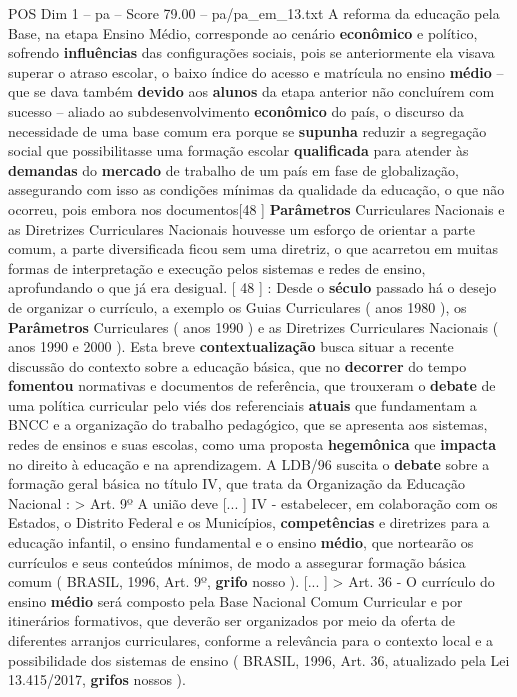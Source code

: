 \begin{textsample}{POS Dim 1 – pa – Score 79.00 – pa/pa\_em\_13.txt}
A reforma da educação pela Base, na etapa Ensino Médio, corresponde ao cenário \textbf{econômico} e político, sofrendo \textbf{influências} das configurações sociais, pois se anteriormente ela visava superar o atraso escolar, o baixo índice do acesso e matrícula no ensino \textbf{médio} – que se dava também \textbf{devido} aos \textbf{alunos} da etapa anterior não concluírem com sucesso – aliado ao subdesenvolvimento \textbf{econômico} do país, o discurso da necessidade de uma base comum era porque se \textbf{supunha} reduzir a segregação social que possibilitasse uma formação escolar \textbf{qualificada} para atender às \textbf{demandas} do \textbf{mercado} de trabalho de um país em fase de globalização, assegurando com isso as condições mínimas da qualidade da educação, o que não ocorreu, pois embora nos documentos[48 ] \textbf{Parâmetros} Curriculares Nacionais e as Diretrizes Curriculares Nacionais houvesse um esforço de orientar a parte comum, a parte diversificada ficou sem uma diretriz, o que acarretou em muitas formas de interpretação e execução pelos sistemas e redes de ensino, aprofundando o que já era desigual. [ 48 ] : Desde o \textbf{século} passado há o desejo de organizar o currículo, a exemplo os Guias Curriculares ( anos 1980 ), os \textbf{Parâmetros} Curriculares ( anos 1990 ) e as Diretrizes Curriculares Nacionais ( anos 1990 e 2000 ).
Esta breve \textbf{contextualização} busca situar a recente discussão do contexto sobre a educação básica, que no \textbf{decorrer} do tempo \textbf{fomentou} normativas e documentos de referência, que trouxeram o \textbf{debate} de uma política curricular pelo viés dos referenciais \textbf{atuais} que fundamentam a BNCC e a organização do trabalho pedagógico, que se apresenta aos sistemas, redes de ensinos e suas escolas, como uma proposta \textbf{hegemônica} que \textbf{impacta} no direito à educação e na aprendizagem.
A LDB/96 suscita o \textbf{debate} sobre a formação geral básica no título IV, que trata da Organização da Educação Nacional : > Art. 9º A união deve [... ] IV - estabelecer, em colaboração com os Estados, o Distrito Federal e os Municípios, \textbf{competências} e diretrizes para a educação infantil, o ensino fundamental e o ensino \textbf{médio}, que nortearão os currículos e seus conteúdos mínimos, de modo a assegurar formação básica comum ( BRASIL, 1996, Art. 9º, \textbf{grifo} nosso ). [... ] > Art. 36 - O currículo do ensino \textbf{médio} será composto pela Base Nacional Comum Curricular e por itinerários formativos, que deverão ser organizados por meio da oferta de diferentes arranjos curriculares, conforme a relevância para o contexto local e a possibilidade dos sistemas de ensino ( BRASIL, 1996, Art. 36, atualizado pela Lei 13.415/2017, \textbf{grifos} nossos ).

\end{textsample}
